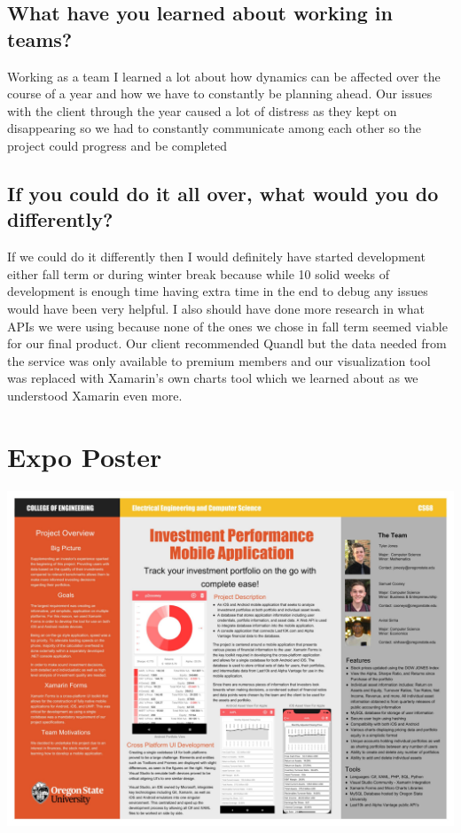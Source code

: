\documentclass[onecolumn, draftclsnofoot,10pt, compsoc]{IEEEtran}
\begin{document}
    \subsection{What have you learned about working in teams?}
    Working as a team I learned a lot about how dynamics can be affected over the course of a year and how we have to constantly be planning ahead. Our issues with the client through the year caused a lot of distress as they kept on disappearing so we had to constantly communicate among each other so the project could progress and be completed 
    
    \subsection{If you could do it all over, what would you do differently?}
    If we could do it differently then I would definitely have started development either fall term or during winter break because while 10 solid weeks of development is enough time having extra time in the end to debug any issues would have been very helpful. I also should have done more research in what APIs we were using because none of the ones we chose in fall term seemed viable for our final product. Our client recommended Quandl but the data needed from the service was only available to premium members and our visualization tool was replaced with Xamarin’s own charts tool which we learned about as we understood Xamarin even more. 

\section{Expo Poster}

\includegraphics[scale=.25, angle=90]{poster.jpg}
    
\end{document}

